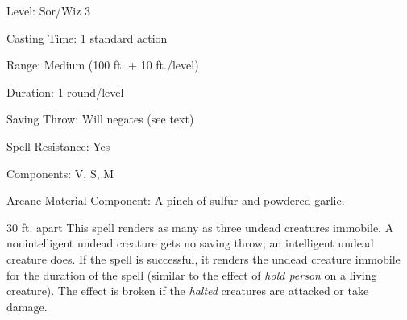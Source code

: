 
\begin{description*}
\item[Level:] Sor/Wiz 3
\item[Casting Time:] 1 standard action
\item[Range:] Medium (100 ft. + 10 ft./level)
\item[Duration:] 1 round/level
\item[Saving Throw:] Will negates (see text)
\item[Spell Resistance:] Yes
\item[Components:] V, S, M
\item[Arcane Material Component:] A pinch of sulfur and powdered garlic.
\end{description*}

30 ft. apart
This spell renders as many as three undead creatures immobile. A nonintelligent
undead creature gets no saving throw; an intelligent undead creature does. If the
spell is successful, it renders the undead creature immobile for the duration of
the spell (similar to the effect of \textit{hold person} on a living creature).
The effect is broken if the \textit{halted} creatures are attacked or take damage.
